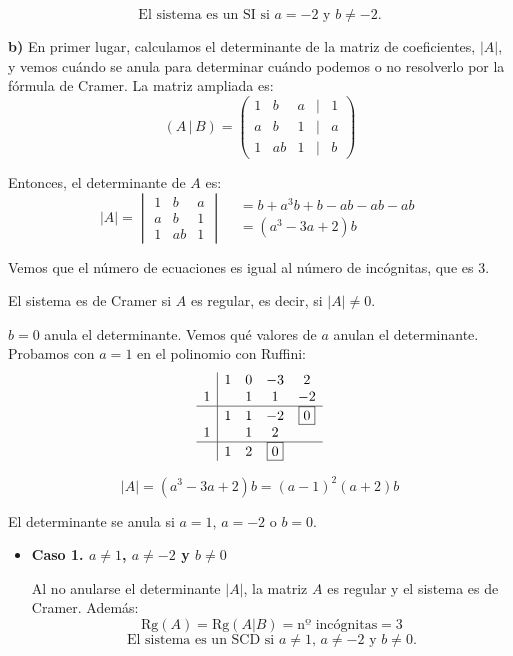 \documentclass[a4paper,12pt]{article}
\begin{document}
\begin{ejercicio}[title=Ejercicio 31]
\begin{itemize}
\begin{itemize}
\[
\boxed{\text{El sistema es un SI si } a=-2 \text{ y } b\neq -2.}
\]
\end{itemize}
\end{itemize}

\textbf{b)}
En primer lugar, calculamos el determinante de la matriz de coeficientes, $|{A}|$, y vemos cuándo se anula para determinar cuándo podemos o no resolverlo por la fórmula de Cramer.
La matriz ampliada es:
$$({A}\,|\,{B}) =
\begin{pmatrix}
1 & b & a &\Big|& 1\\
a & b & 1 &\Big|& a\\
1 & ab & 1 &\Big|& b
\end{pmatrix}$$
\end{ejercicio}
\begin{ejercicio}[title=Ejercicio 31]
Entonces, el determinante de ${A}$ es:
$$|{A}| =
\begin{vmatrix}
1 & b & a\\
a & b & 1\\
1 & ab & 1
\end{vmatrix}
\begin{aligned}
& = b+a^3b+b-ab-ab-ab \\
&= (a^3 - 3a + 2)b
\end{aligned}
$$

Vemos que el número de ecuaciones es igual al número de incógnitas, que es 3.

El sistema es de Cramer si ${A}$ es regular, es decir, si $|{A}| \neq 0$.

$b=0$ anula el determinante. Vemos qué valores de $a$ anulan el determinante. Probamos con $a=1$ en el polinomio con Ruffini:
$$
\begin{array}{c|cccc}
  & 1 & 0 & -3 & 2 \\
1 &   & 1 & 1 & -2 \\
\hline
  & 1 & 1 & -2 & \boxed{0} \\
1 &   & 1 & 2 \\
\hline
  & 1 & 2 & \boxed{0}
\end{array}
$$

$$|A| = (a^3 - 3a + 2)b = (a-1)^2(a+2)b$$

El determinante se anula si $a=1$, $a=-2$ o $b=0$.

\begin{itemize}
    \item \textbf{Caso 1. $a \neq 1$, $a \neq -2$ y $b \neq 0$}
    
Al no anularse el determinante $|{A}|$, la matriz ${A}$ es regular y el sistema es de Cramer. Además:
\[
\text{Rg}({A}) = \text{Rg}({A}|{B}) = \text{nº incógnitas} = 3
\]
\[
\boxed{\text{El sistema es un SCD si } a \ne 1 \text{, } a \ne -2 \text{ y } b \ne 0.}
\]


\end{itemize}
\end{ejercicio}
\end{document}
